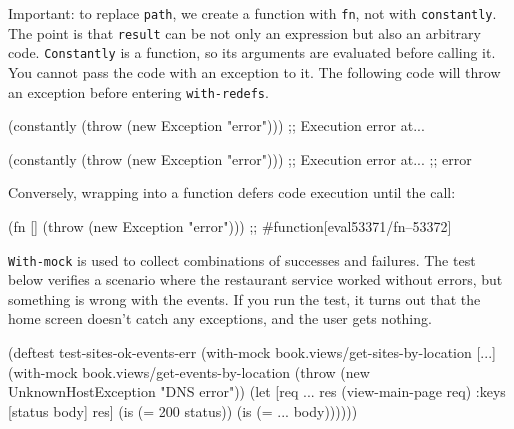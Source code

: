 Important: to replace \verb|path|, we create a function with \verb|fn|, not with \verb|constantly|. The point is that \verb|result| can be not only an expression but also an arbitrary code. \verb|Constantly| is a function, so its arguments are evaluated before calling it. You cannot pass the code with an exception to it. The following code will throw an exception before entering \verb|with-redefs|.

\ifnarrow

\begin{english}
  \begin{clojure}
(constantly
  (throw (new Exception "error")))
;; Execution error at...
  \end{clojure}
\end{english}

\else

\begin{english}
  \begin{clojure}
(constantly (throw (new Exception "error")))
;; Execution error at...
;; error
  \end{clojure}
\end{english}

\fi


\noindent
Conversely, wrapping into a function defers code execution until the call:

\begin{english}
  \begin{clojure}
(fn [] (throw (new Exception "error")))
;; #function[eval53371/fn--53372]
  \end{clojure}
\end{english}

\verb|With-mock| is used to collect combinations of successes and failures. The test below verifies a scenario where the restaurant service worked without errors, but something is wrong with the events. If you run the test, it turns out that the home screen doesn't catch any exceptions, and the user gets nothing.

\ifnarrow

\begin{english}
  \begin{clojure/lines}
(deftest test-sites-ok-events-err
  (with-mock
    book.views/get-sites-by-location
    [...]
    (with-mock
     book.views/get-events-by-location
     (throw
      (new UnknownHostException
        "DNS error"))
     (let [req {...}
           res (view-main-page req)
           {:keys [status body]} res]
       (is (= 200 status))
       (is (= {...} body))))))
  \end{clojure/lines}
\end{english}

